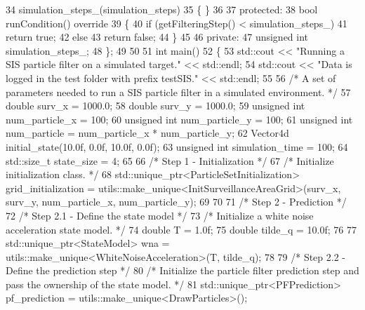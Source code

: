 \begin{DoxyCodeInclude}
34         simulation\_steps\_(simulation\_steps)
35     \{ \}
36 
37 \textcolor{keyword}{protected}:
38     \textcolor{keywordtype}{bool} runCondition()\textcolor{keyword}{ override}
39 \textcolor{keyword}{    }\{
40         \textcolor{keywordflow}{if} (getFilteringStep() < simulation\_steps\_)
41             \textcolor{keywordflow}{return} \textcolor{keyword}{true};
42         \textcolor{keywordflow}{else}
43             \textcolor{keywordflow}{return} \textcolor{keyword}{false};
44     \}
45 
46 \textcolor{keyword}{private}:
47     \textcolor{keywordtype}{unsigned} \textcolor{keywordtype}{int} simulation\_steps\_;
48 \};
49 
50 
51 \textcolor{keywordtype}{int} main()
52 \{
53     std::cout << \textcolor{stringliteral}{"Running a SIS particle filter on a simulated target."} << std::endl;
54     std::cout << \textcolor{stringliteral}{"Data is logged in the test folder with prefix testSIS."} << std::endl;
55 
56     \textcolor{comment}{/* A set of parameters needed to run a SIS particle filter in a simulated environment. */}
57     \textcolor{keywordtype}{double} surv\_x = 1000.0;
58     \textcolor{keywordtype}{double} surv\_y = 1000.0;
59     \textcolor{keywordtype}{unsigned} \textcolor{keywordtype}{int} num\_particle\_x = 100;
60     \textcolor{keywordtype}{unsigned} \textcolor{keywordtype}{int} num\_particle\_y = 100;
61     \textcolor{keywordtype}{unsigned} \textcolor{keywordtype}{int} num\_particle = num\_particle\_x * num\_particle\_y;
62     Vector4d initial\_state(10.0f, 0.0f, 10.0f, 0.0f);
63     \textcolor{keywordtype}{unsigned} \textcolor{keywordtype}{int} simulation\_time = 100;
64     std::size\_t state\_size = 4;
65 
66     \textcolor{comment}{/* Step 1 - Initialization */}
67     \textcolor{comment}{/* Initialize initialization class. */}
68     std::unique\_ptr<ParticleSetInitialization> grid\_initialization = 
      utils::make\_unique<InitSurveillanceAreaGrid>(surv\_x, surv\_y, num\_particle\_x, num\_particle\_y);
69 
70 
71     \textcolor{comment}{/* Step 2 - Prediction */}
72     \textcolor{comment}{/* Step 2.1 - Define the state model */}
73     \textcolor{comment}{/* Initialize a white noise acceleration state model. */}
74     \textcolor{keywordtype}{double} T = 1.0f;
75     \textcolor{keywordtype}{double} tilde\_q = 10.0f;
76 
77     std::unique\_ptr<StateModel> wna = utils::make\_unique<WhiteNoiseAcceleration>(T, tilde\_q);
78 
79     \textcolor{comment}{/* Step 2.2 - Define the prediction step */}
80     \textcolor{comment}{/* Initialize the particle filter prediction step and pass the ownership of the state model. */}
81     std::unique\_ptr<PFPrediction> pf\_prediction = utils::make\_unique<DrawParticles>();

\end{DoxyCodeInclude}
